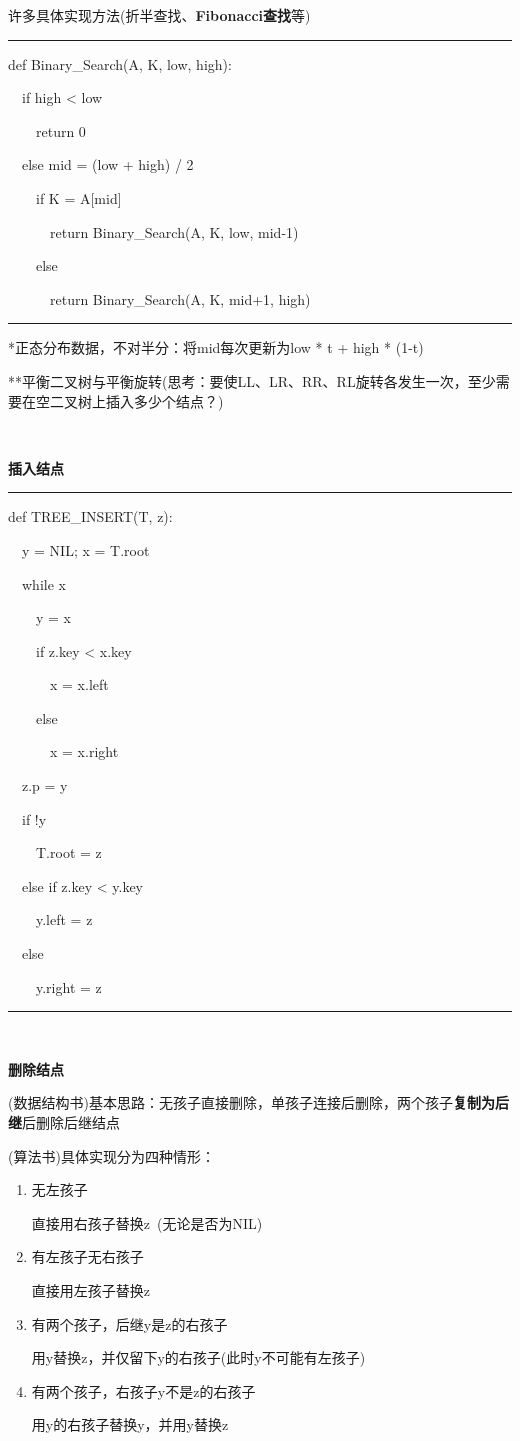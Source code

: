 \documentclass[a4paper,UTF8,fontset=windows]{ctexart}
\newenvironment{code}{\rule{36em}{0.1em}\setlength{\parindent}{1em}

}{

\setlength{\parindent}{0em}\rule{36em}{0.1em}}
\begin{document}
许多具体实现方法(折半查找、\textbf{Fibonacci查找}等)

\begin{code}
def Binary\_Search(A, K, low, high):

\ \ if high < low

\ \ \ \ return 0

\ \ else mid = (low + high) / 2

\ \ \ \ if K = A[mid]

\ \ \ \ \ \ return Binary\_Search(A, K, low, mid-1)

\ \ \ \ else

\ \ \ \ \ \ return Binary\_Search(A, K, mid+1, high)
\end{code}

*\hspace{0em}正态分布数据，不对半分：将mid每次更新为low * t + high * (1-t)

**\hspace{0em}平衡二叉树与平衡旋转(思考：要使LL、LR、RR、RL旋转各发生一次，至少需要在空二叉树上插入多少个结点？)

\

\textbf{插入结点}

\begin{code}
def TREE\_INSERT(T, z):

\ \ y = NIL; x = T.root

\ \ while x

\ \ \ \ y = x

\ \ \ \ if z.key < x.key

\ \ \ \ \ \ x = x.left

\ \ \ \ else

\ \ \ \ \ \ x = x.right

\ \ z.p = y

\ \ if !y

\ \ \ \ T.root = z

\ \ else if z.key < y.key

\ \ \ \ y.left = z

\ \ else

\ \ \ \ y.right = z
\end{code}

\

\textbf{删除结点}

(数据结构书)基本思路：无孩子直接删除，单孩子连接后删除，两个孩子\textbf{复制为后继}后删除后继结点

(算法书)具体实现分为四种情形：

\begin{enumerate}
\item 
无左孩子

直接用右孩子替换z\ (无论是否为NIL)

\item
有左孩子无右孩子

直接用左孩子替换z

\item
有两个孩子，后继y是z的右孩子

用y替换z，并仅留下y的右孩子(此时y不可能有左孩子)

\item
有两个孩子，右孩子y不是z的右孩子

用y的右孩子替换y，并用y替换z
\end{enumerate}
\end{document}
